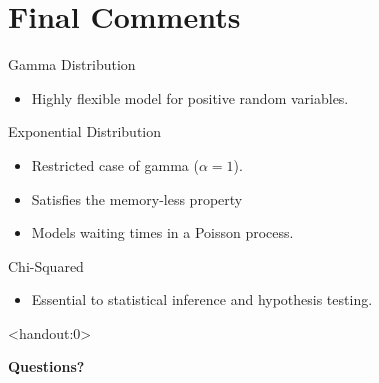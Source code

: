 \section{Final Comments}

\begin{frame}
  \begin{block}{Gamma Distribution}
    \begin{itemize}
    \item Highly flexible model for positive random variables.
    \end{itemize}
  \end{block}

  \pause
  
  \begin{block}{Exponential Distribution}
    \begin{itemize}
    \item Restricted case of gamma ($\alpha=1$).
    \item Satisfies the memory-less property
    \item Models waiting times in a Poisson process.
    \end{itemize}
  \end{block}

  \pause
  
  \begin{block}{Chi-Squared}
    \begin{itemize}
    \item Essential to statistical inference and hypothesis testing.
    \end{itemize}
  \end{block}
\end{frame}

\begin{frame}<handout:0>
  \begin{center}
    \Huge{\textbf{Questions?}}
  \end{center}
\end{frame}

